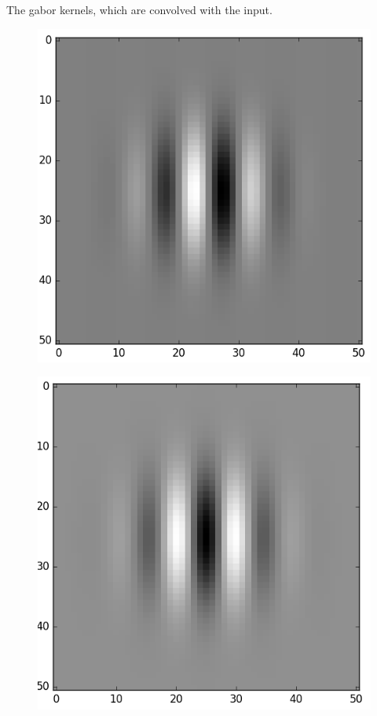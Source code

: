 \documentclass[]{article}
\begin{document}
The gabor kernels, which are convolved with the input.
\begin{figure}
    \includegraphics{gabor_kernel.png}
\end{figure}
\begin{figure}
    \includegraphics{gabor_kernel2.png}
\end{figure}
\end{document}
